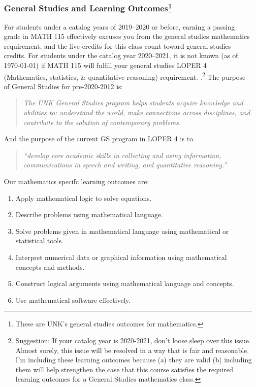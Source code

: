 \documentclass[12pt]{article}
\newcounter{ex}\setcounter{ex}{0}
\begin{document}
\subsubsection*{General Studies and Learning Outcomes\footnote{These are UNK's general studies outcomes for mathematics.}}

For students under a catalog years of 2019--2020 or before, earning a passing grade in MATH 115 effectively excuses you from the general studies mathematics requirement, and the five credits for this class count toward general studies credits.  For students under the catalog year 2020--2021, it is not known (as of \today) if MATH 115 will fulfill your general studies LOPER 4 (Mathematics, statistics, \& quantitative reasoning) requirement. .\footnote{Suggestion: If your catalog
year is 2020-2021, don't loose sleep over this issue. Almost surely, this issue will be resolved in a way that is fair and reasonable.  I'm including these learning outcomes because (a) they are valid (b) including them will help strengthen the case that  this course satisfies the required learning outcomes for a General Studies mathematics class. } The purpose of  General Studies for  pre-2020-2012  is:
\begin{quote}
\emph{ The UNK General Studies program helps students acquire knowledge and abilities to: understand the world, make connections across disciplines, and contribute to the solution of contemporary
problems. }
\end{quote}
And the purpose of the current GS program in LOPER 4 is to
\begin{quote}
    \emph{ “develop core academic skills in collecting and using information, communications in speech and writing, and quantitative reasoning.” }
\end{quote}
Our mathematics specifc learning outcomes are:
\begin{enumerate}
  \item Apply mathematical logic to solve equations.
    \item Describe problems using mathematical language.
    \item Solve problems given in mathematical language using mathematical or statistical tools.
    \item Interpret numerical data or graphical information using mathematical concepts and methods.
    \item Construct logical arguments using mathematical language and concepts.
    \item Use mathematical software effectively.
\end{enumerate}
\end{document}
